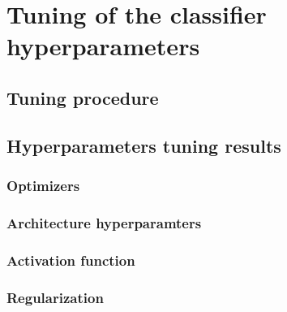 \chapter{Tuning of the classifier hyperparameters}

\section{Tuning procedure}
\lipsum[1]

\section{Hyperparameters tuning results}
\lipsum[1]
\subsection{Optimizers }
\lipsum[1]
\subsection{Architecture hyperparamters}
\lipsum[1]
\subsection{Activation function}
\lipsum[1]
\subsection{Regularization}
\lipsum[1]
